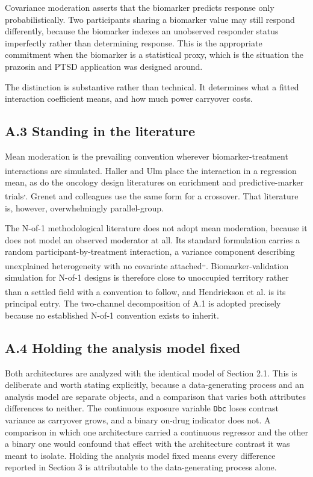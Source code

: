 \documentclass[
  11pt,
]{article}
\begin{document}
Covariance moderation asserts that the biomarker predicts response
only probabilistically. Two participants sharing a biomarker value
may still respond differently, because the biomarker indexes an
unobserved responder status imperfectly rather than determining
response. This is the appropriate commitment when the biomarker is a
statistical proxy, which is the situation the prazosin and PTSD
application was designed around.

The distinction is substantive rather than technical. It determines
what a fitted interaction coefficient means, and how much power
carryover costs.

\subsection{A.3 Standing in the literature}

Mean moderation is the prevailing convention wherever
biomarker-treatment interactions are simulated. Haller and Ulm\textsuperscript{} place the interaction in a regression mean, as do the
oncology design literatures on enrichment and predictive-marker
trials\textsuperscript{,}. Grenet and colleagues\textsuperscript{} use the same form for a crossover. That literature is,
however, overwhelmingly parallel-group.

The N-of-1 methodological literature does not adopt mean moderation,
because it does not model an observed moderator at all. Its standard
formulation carries a random participant-by-treatment interaction, a
variance component describing unexplained heterogeneity with no
covariate attached\textsuperscript{,,}. Biomarker-validation simulation for N-of-1 designs is
therefore close to unoccupied territory rather than a settled field
with a convention to follow, and Hendrickson et al.\textsuperscript{} is its principal entry. The two-channel
decomposition of A.1 is adopted precisely because no established
N-of-1 convention exists to inherit.

\subsection{A.4 Holding the analysis model fixed}

Both architectures are analyzed with the identical model of Section
2.1. This is deliberate and worth stating explicitly, because a
data-generating process and an analysis model are separate objects,
and a comparison that varies both attributes differences to neither.
The continuous exposure variable \texttt{Dbc} loses contrast variance
as carryover grows, and a binary on-drug indicator does not. A
comparison in which one architecture carried a continuous regressor
and the other a binary one would confound that effect with the
architecture contrast it was meant to isolate. Holding the analysis
model fixed means every difference reported in Section 3 is
attributable to the data-generating process alone.
\end{document}
